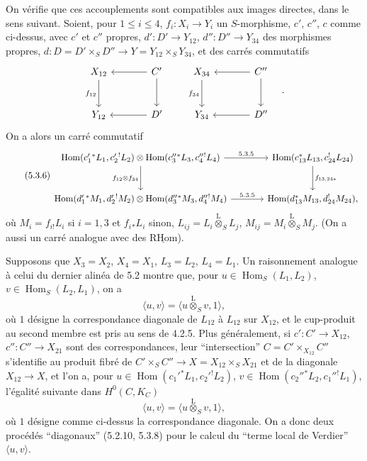 \documentclass[11pt]{article}
\DeclareMathOperator{\Hom}{Hom}
\newcommand{\R}{\mathrm{R}}\newcommand{\RHomCore}{\mathrm{RHom}}
\providecommand{\RHom}{\RHomCore}
\providecommand{\uRHom}{\underline{\RHom}}
\providecommand{\RHom}{\RHomCore}
\providecommand{\Hom}{\operatorname{Hom}}
\providecommand{\RHom}{\R\mathcal{H}om}
\providecommand{\R}{\mathrm R}
\providecommand{\RHom}{\RHomCore}
\providecommand{\Hom}{\operatorname{Hom}}
\begin{document}
On vérifie que ces accouplements sont compatibles aux images directes, dans le sens suivant. Soient, pour $1\leq i\leq4$, $f_i:X_i\to Y_i$ un $S$-morphisme, $c'$, $c''$, $c$ comme ci-dessus, avec $c'$ et $c''$ propres, $d':D'\to Y_{12}$, $d'':D''\to Y_{34}$ des morphismes propres, $d:D=D'\times_SD''\to Y=Y_{12}\times_SY_{34}$, et des carrés commutatifs
\[
\begin{tikzcd}[column sep=large,row sep=large]
X_{12} \arrow[d,"f_{12}"'] & C' \arrow[l] \arrow[d] \\
Y_{12} & D' \arrow[l]
\end{tikzcd}
\qquad
\begin{tikzcd}[column sep=large,row sep=large]
X_{34} \arrow[d,"f_{34}"'] & C'' \arrow[l] \arrow[d] \\
Y_{34} & D'' \arrow[l]
\end{tikzcd}\quad .
\]
On a alors un carré commutatif
\begin{equation}
\tag{5.3.6}
\begin{tikzcd}[column sep=large,row sep=large]
\Hom(c_1'{}^*L_1,c_2'{}^!L_2)\otimes\Hom(c_3''{}^*L_3,c_4''{}^!L_4) \arrow[r,"5.3.5"] \arrow[d,"f_{12}\otimes f_{34}"']
& \Hom(c_{13}^*L_{13},c_{24}^!L_{24}) \arrow[d,"f_{13,24*}"] \\
\Hom(d_1'{}^*M_1,d_2'{}^!M_2)\otimes\Hom(d_3''{}^*M_3,d_4''{}^!M_4) \arrow[r,"5.3.5"]
& \Hom(d_{13}^*M_{13},d_{24}^!M_{24}),
\end{tikzcd}
\end{equation}
où $M_i=f_{i!}L_i$ si $i=1,3$ et $f_i{}_*L_i$ sinon, $L_{ij}=L_i\overset{\mathrm{L}}{\otimes}_SL_j$, $M_{ij}=M_i\overset{\mathrm{L}}{\otimes}_SM_j$. (On a aussi un carré analogue avec des $\uRHom$).

Supposons que $X_3=X_2$, $X_4=X_1$, $L_3=L_2$, $L_4=L_1$. Un raisonnement analogue à celui du dernier alinéa de 5.2 montre que, pour $u\in\Hom_S(L_1,L_2)$, $v\in\Hom_S(L_2,L_1)$, on a
\begin{equation}
\tag{5.3.7}
\langle u,v\rangle=\langle u\overset{\mathrm{L}}{\otimes}_Sv,1\rangle,
\end{equation}
où $1$ désigne la correspondance diagonale de $L_{12}$ à $L_{12}$ sur $X_{12}$, et le cup-produit au second membre est pris au sens de 4.2.5. Plus généralement, si $c':C'\to X_{12}$, $c'':C''\to X_{21}$ sont des correspondances, leur ``intersection'' $C=C'\times_{X_{12}}C''$ s'identifie au produit fibré de $C'\times_SC''\to X=X_{12}\times_SX_{21}$ et de la diagonale $X_{12}\to X$, et l'on a, pour $u\in\Hom(c_1'{}^*L_1,c_2'{}^!L_2)$, $v\in\Hom(c_2''{}^*L_2,c_1''{}^!L_1)$, l'égalité suivante dans $H^0(C,K_C)$
\begin{equation}
\tag{5.3.8}
\langle u,v\rangle=\langle u\overset{\mathrm{L}}{\otimes}_Sv,1\rangle,
\end{equation}
où $1$ désigne comme ci-dessus la correspondance diagonale. On a donc deux procédés ``diagonaux'' (5.2.10, 5.3.8) pour le calcul du ``terme local de Verdier'' $\langle u,v\rangle$.
\end{document}
